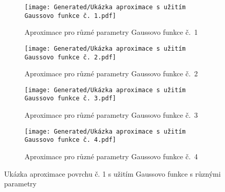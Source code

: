 \begin{landscapeimagepage}
    \vspace*{\fill}
    \begin{figure}[H]
        \centering
        \begin{subfigure}{.5\textheight}
            \centering
            \texttt{[image: Generated/Ukázka aproximace s užitím Gaussovo funkce č. 1.pdf]}
            \caption{Aproximace pro různé parametry Gaussovo funkce č.~1}
            \label{fig:Ukázka aproximace povrchu s užitím Gaussovo funkce č. 1}
        \end{subfigure}
        \vspace{0.5cm}
        \hspace{2.5cm}
        \begin{subfigure}{.5\textheight}
            \centering
            \texttt{[image: Generated/Ukázka aproximace s užitím Gaussovo funkce č. 2.pdf]}
            \caption{Aproximace pro různé parametry Gaussovo funkce č.~2}
            \label{fig:Ukázka aproximace povrchu s užitím Gaussovo funkce č. 2}
        \end{subfigure}
        \vspace{0.5cm}
        \begin{subfigure}{.5\textheight}
            \centering
            \texttt{[image: Generated/Ukázka aproximace s užitím Gaussovo funkce č. 3.pdf]}
            \caption{Aproximace pro různé parametry Gaussovo funkce č.~3}
            \label{fig:Ukázka aproximace povrchu s užitím Gaussovo funkce č. 3}
        \end{subfigure}
        \hspace{2.5cm}
        \begin{subfigure}{.5\textheight}
            \centering
            \texttt{[image: Generated/Ukázka aproximace s užitím Gaussovo funkce č. 4.pdf]}
            \caption{Aproximace pro různé parametry Gaussovo funkce č.~4}
            \label{fig:Ukázka aproximace povrchu s užitím Gaussovo funkce č. 4}
        \end{subfigure}
        \caption{Ukázka aproximace povrchu č. 1 s užitím Gaussovo funkce s různými parametry}
        \label{fig:Ukázka aproximace povrchu č. 1 s užitím Gaussovo funkce s různými parametry}
    \end{figure}
    \vspace*{\fill}
\end{landscapeimagepage}

